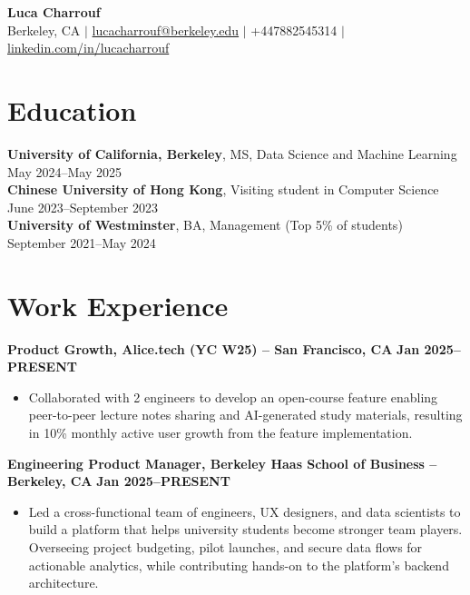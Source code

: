 \documentclass{article}
\begin{document}
\begin{center}
\textbf{\Large Luca Charrouf}\\
\vspace{0.1cm}
Berkeley, CA $|$ \href{mailto:lucacharrouf@berkeley.edu}{lucacharrouf@berkeley.edu} $|$ +447882545314 $|$ \href{https://linkedin.com/in/lucacharrouf}{linkedin.com/in/lucacharrouf}
\end{center}

\section*{Education}
\textbf{University of California, Berkeley}, MS, Data Science and Machine Learning \hfill May 2024--May 2025\\
\textbf{Chinese University of Hong Kong}, Visiting student in Computer Science \hfill June 2023--September 2023\\
\textbf{University of Westminster}, BA, Management (Top 5\% of students) \hfill September 2021--May 2024

\section*{Work Experience}
\textbf{Product Growth, Alice.tech (YC W25) -- San Francisco, CA} \hfill \textbf{Jan 2025--PRESENT}
\begin{itemize}[leftmargin=*,noitemsep]
  \item Collaborated with 2 engineers to develop an open-course feature enabling peer-to-peer lecture notes sharing and AI-generated study materials, resulting in 10\% monthly active user growth from the feature implementation.
\end{itemize}

\textbf{Engineering Product Manager, Berkeley Haas School of Business -- Berkeley, CA} \hfill \textbf{Jan 2025--PRESENT}
\begin{itemize}[leftmargin=*,noitemsep]
  \item Led a cross-functional team of engineers, UX designers, and data scientists to build a platform that helps university students become stronger team players. Overseeing project budgeting, pilot launches, and secure data flows for actionable analytics, while contributing hands-on to the platform's backend architecture.
\end{itemize}
\end{document}
